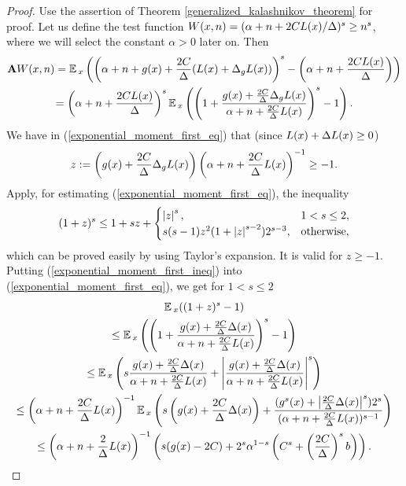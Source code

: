 	\begin{proof}
		Use the assertion of Theorem \ref{generalized_kalashnikov_theorem} for proof. Let us define the test function $W(x, n) = (\alpha + n + 2CL(x) / \Delta)^{s} \geq n^{s}$, where we will select the constant $\alpha > 0$ later on. Then
		\begin{gather}
		\mathbf{A}W(x, n) = \operatorname*{\mathbb{E}}{}_{x}\left(\left(\alpha + n + g(x) + \frac{2C}{\Delta}(L(x) + \Delta_{g}L(x))\right)^{s} - \left(\alpha + n + \frac{2CL(x)}{\Delta}\right)\right) \notag\\ = \left(\alpha + n + \frac{2CL(x)}{\Delta}\right)^{s}\operatorname*{\mathbb{E}}{}_{x}\left(\left(1 + \frac{g(x) + \frac{2C}{\Delta}\Delta_{g}L(x)}{\alpha + n + \frac{2C}{\Delta}L(x)}\right)^{s} - 1\right).
		\label{exponential_moment_first_eq}
		\end{gather}
		We have in (\ref{exponential_moment_first_eq}) that (since $L(x) + \Delta L(x) \geq 0$)
		\begin{gather*}
		z := \left(g(x) + \frac{2C}{\Delta}\Delta_{g}L(x)\right)\left(\alpha + n + \frac{2C}{\Delta}L(x)\right)^{-1} \geq -1.
		\end{gather*}
		Apply, for estimating (\ref{exponential_moment_first_eq}), the inequality
		\begin{gather}
		(1 + z)^{s} \leq 1 + sz + \begin{cases}
		\left|z\right|^{s}, & 1 < s \leq 2,\\
		s(s-1)z^{2}(1 + \left|z\right|^{s-2})2^{s-3}, & \text{otherwise},
		\end{cases}
		\label{exponential_moment_first_ineq}
		\end{gather}
		which can be proved easily by using Taylor's expansion. It is valid for $z \geq -1$. Putting (\ref{exponential_moment_first_ineq}) into (\ref{exponential_moment_first_eq}), we get for $1 < s \leq 2$
		\begin{gather}
		\E{}_{x}((1 + z)^{s} - 1) \notag\\ \leq \E{}_{x}\left(\left(1 + \frac{\gffVar(x) + \frac{2C}{\Delta}\Delta(x)}{\alpha + n + \frac{2C}{\Delta}\ltfVar(x)}\right)^{s} - 1\right) \notag\\ \leq \E{}_{x}\left(s\frac{\gffVar(x) + \frac{2C}{\Delta}\Delta(x)}{\alpha + n + \frac{2C}{\Delta}\ltfVar(x)} + \absolute{\frac{\gffVar(x) + \frac{2C}{\Delta}\Delta(x)}{\alpha + n + \frac{2C}{\Delta}\ltfVar(x)}}^{s}\right) \notag\\ \leq \left(\alpha + n + \frac{2C}{\Delta}\ltfVar(x)\right)^{-1}\E{}_{x}\left(s\left(\gffVar(x) + \frac{2C}{\Delta}\Delta(x)\right) + \frac{(\gffVar^{s}(x) + \absolute{\frac{2C}{\Delta}\Delta(x)}^{s})2^{s}}{(\alpha + n + \frac{2C}{\Delta}\ltfVar(x))^{s-1}}\right) \notag\\ \leq \left(\alpha + n + \frac{2}{\Delta}\ltfVar(x)\right)^{-1}\left(s(\gffVar(x) - 2C) + 2^{s}\alpha^{1-s}\left(C^{s} + \left(\frac{2C}{\Delta}\right)^{s}b\right)\right).

\end{gather}
\end{proof}
